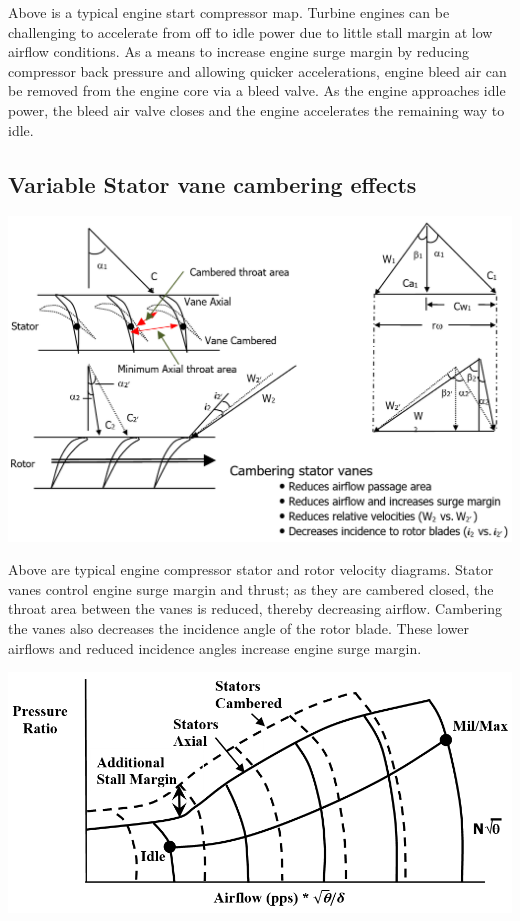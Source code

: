 \documentclass[
]{book}
\begin{document}
Above is a typical engine start compressor map. Turbine engines can be
challenging to accelerate from off to idle power due to little stall margin at
low airflow conditions. As a means to increase engine surge margin by reducing
compressor back pressure and allowing quicker accelerations, engine bleed air
can be removed from the engine core via a bleed valve. As the engine approaches
idle power, the bleed air valve closes and the engine accelerates the remaining
way to idle.

\hypertarget{variable-stator-vane-cambering-effects}{%
\subsection{Variable Stator vane cambering effects}\label{variable-stator-vane-cambering-effects}}

\includegraphics{media/17/stator-rotor-velocity.png}

Above are typical engine compressor stator and rotor velocity diagrams. Stator
vanes control engine surge margin and thrust; as they are cambered closed, the
throat area between the vanes is reduced, thereby decreasing airflow. Cambering
the vanes also decreases the incidence angle of the rotor blade. These lower
airflows and reduced incidence angles increase engine surge margin.

\includegraphics{media/17/variable-geometry-compressor-map.png}
\end{document}
